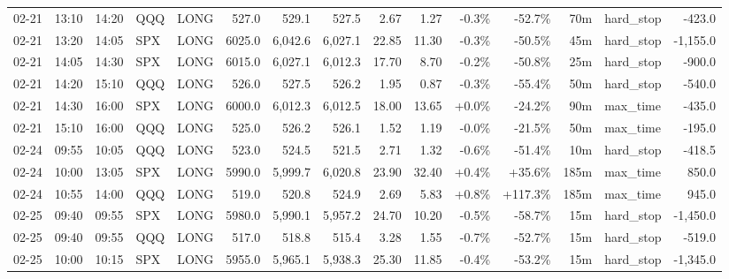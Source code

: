 \documentclass[11pt,a4paper,twoside]{article}
\begin{document}
\begin{landscape}
\begin{center}
\begin{longtable}{>{\color{txtmain}}l l l l l r r r r r r r r >{\color{txtmain}}l r}
02-21 & 13:10 & 14:20 & QQQ & LONG & 527.0 & 529.1 & 527.5 & 2.67 & 1.27 & \textcolor{lossred}{-0.3\%} & \textcolor{lossred}{-52.7\%} & 70m & hard\_stop & \textcolor{lossred}{-423.0} \\
02-21 & 13:20 & 14:05 & SPX & LONG & 6025.0 & 6,042.6 & 6,027.1 & 22.85 & 11.30 & \textcolor{lossred}{-0.3\%} & \textcolor{lossred}{-50.5\%} & 45m & hard\_stop & \textcolor{lossred}{-1,155.0} \\
02-21 & 14:05 & 14:30 & SPX & LONG & 6015.0 & 6,027.1 & 6,012.3 & 17.70 & 8.70 & \textcolor{lossred}{-0.2\%} & \textcolor{lossred}{-50.8\%} & 25m & hard\_stop & \textcolor{lossred}{-900.0} \\
02-21 & 14:20 & 15:10 & QQQ & LONG & 526.0 & 527.5 & 526.2 & 1.95 & 0.87 & \textcolor{lossred}{-0.3\%} & \textcolor{lossred}{-55.4\%} & 50m & hard\_stop & \textcolor{lossred}{-540.0} \\
02-21 & 14:30 & 16:00 & SPX & LONG & 6000.0 & 6,012.3 & 6,012.5 & 18.00 & 13.65 & \textcolor{wingreen}{+0.0\%} & \textcolor{lossred}{-24.2\%} & 90m & max\_time & \textcolor{lossred}{-435.0} \\
02-21 & 15:10 & 16:00 & QQQ & LONG & 525.0 & 526.2 & 526.1 & 1.52 & 1.19 & \textcolor{lossred}{-0.0\%} & \textcolor{lossred}{-21.5\%} & 50m & max\_time & \textcolor{lossred}{-195.0} \\
02-24 & 09:55 & 10:05 & QQQ & LONG & 523.0 & 524.5 & 521.5 & 2.71 & 1.32 & \textcolor{lossred}{-0.6\%} & \textcolor{lossred}{-51.4\%} & 10m & hard\_stop & \textcolor{lossred}{-418.5} \\
02-24 & 10:00 & 13:05 & SPX & LONG & 5990.0 & 5,999.7 & 6,020.8 & 23.90 & 32.40 & \textcolor{wingreen}{+0.4\%} & \textcolor{wingreen}{+35.6\%} & 185m & max\_time & \textcolor{wingreen}{850.0} \\
02-24 & 10:55 & 14:00 & QQQ & LONG & 519.0 & 520.8 & 524.9 & 2.69 & 5.83 & \textcolor{wingreen}{+0.8\%} & \textcolor{wingreen}{+117.3\%} & 185m & max\_time & \textcolor{wingreen}{945.0} \\
02-25 & 09:40 & 09:55 & SPX & LONG & 5980.0 & 5,990.1 & 5,957.2 & 24.70 & 10.20 & \textcolor{lossred}{-0.5\%} & \textcolor{lossred}{-58.7\%} & 15m & hard\_stop & \textcolor{lossred}{-1,450.0} \\
02-25 & 09:40 & 09:55 & QQQ & LONG & 517.0 & 518.8 & 515.4 & 3.28 & 1.55 & \textcolor{lossred}{-0.7\%} & \textcolor{lossred}{-52.7\%} & 15m & hard\_stop & \textcolor{lossred}{-519.0} \\
02-25 & 10:00 & 10:15 & SPX & LONG & 5955.0 & 5,965.1 & 5,938.3 & 25.30 & 11.85 & \textcolor{lossred}{-0.4\%} & \textcolor{lossred}{-53.2\%} & 15m & hard\_stop & \textcolor{lossred}{-1,345.0} \\

\end{longtable}
\end{center}
\end{landscape}
\end{document}
